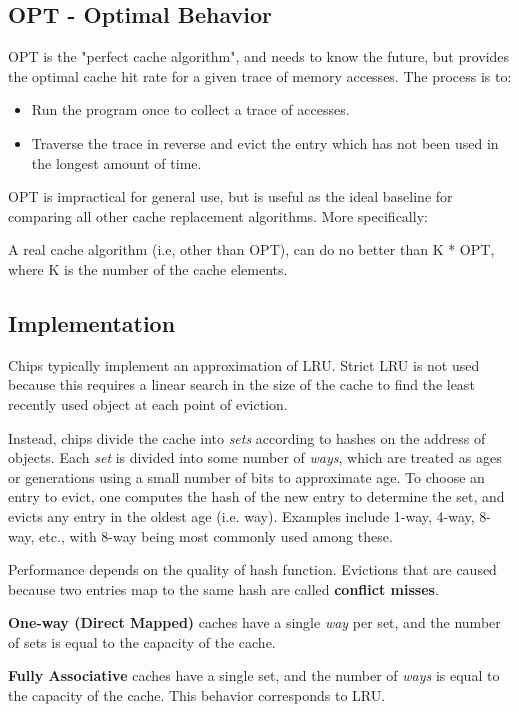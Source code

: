 \documentclass[twoside]{article}
\begin{document}
\subsection{OPT - Optimal Behavior}
OPT is the "perfect cache algorithm", and needs to know the future, but provides
the optimal cache hit rate for a given trace of memory accesses. The process is
to:
\begin{itemize}
    \item Run the program once to collect a trace of accesses.
    \item Traverse the trace in reverse and evict the entry which has not been
        used in the longest amount of time.
\end{itemize}
OPT is impractical for general use, but is useful as the ideal baseline for
comparing all other cache replacement algorithms. More specifically:

A real cache algorithm (i.e, other than OPT), can do no better than K * OPT,
where K is the number of the cache elements.

\subsection{Implementation}

Chips typically implement an approximation of LRU. Strict LRU is not used
because this requires a linear search in the size of the cache to find the least
recently used object at each point of eviction.

Instead, chips divide the cache into \emph{sets} according to hashes on the
address of objects. Each \emph{set} is divided into some number of \emph{ways},
which are treated as ages or generations using a small number of bits to
approximate age. To choose an entry to evict, one computes the hash of the new
entry to determine the set, and evicts any entry in the oldest age (i.e. way).
Examples include 1-way, 4-way, 8-way, etc., with 8-way being most commonly used
among these.

Performance depends on the quality of hash function. Evictions that are caused
because two entries map to the same hash are called \textbf{conflict misses}.

\textbf{One-way (Direct Mapped)} caches have a single \emph{way} per set, and
the number of sets is equal to the capacity of the cache.

\textbf{Fully Associative} caches have a single set, and the number of
\emph{ways} is equal to the capacity of the cache. This behavior corresponds to
LRU.
\end{document}
